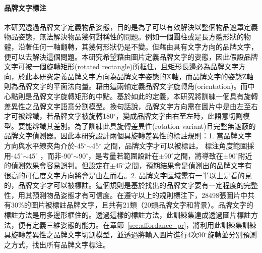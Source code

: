 \paragraph{品牌文字標注}
本研究透過品牌文字定義物品姿態，目的是為了可以有效解決以整個物品遮罩定義物品姿態，無法解決物品幾何對稱性的問題。例如一個圓柱或是長方體形狀的物體，沿著任何一軸翻轉，其幾何形狀仍是不變。但藉由具有文字方向的品牌文字，便可以去解決這個問題。本研究希望藉由圖片定義品牌文字的姿態，因此假設品牌文字可被一個旋轉矩形(rotated rectangle)所框住，且矩形長邊必為品牌文字方向，於此本研究定義品牌文字方向為品牌文字姿態的X軸，而品牌文字的姿態Z軸則為品牌文字的平面法向量。藉由這兩軸定義品牌文字旋轉角(orientation)。而中心點則是品牌文字旋轉矩形的中點。基於如此的定義，本研究將訓練一個具有旋轉差異性之品牌文字語意分割模型。換句話說，品牌文字方向需在圖片中是由左至右才可被辨識，若品牌文字被旋轉180$^{\circ}$，變成品牌文字由右至左時，此語意切割模型。要能辨識其差別。為了訓練此具旋轉差異性(rotation-variant)且完整無遮蔽的品牌文字偵測器。因此本研究設計兩個具旋轉差異性的標註規則：1. 當品牌文字方向與水平線夾角介於-45$^{\circ}$$\sim$45$^{\circ}$ 之間，品牌文字才可以被標註。
標注角度範圍採用-45$^{\circ}$$\sim$45$^{\circ}$ ，而非-90$^{\circ}$$\sim$90$^{\circ}$，是考量若範圍設計在$\pm$90$^{\circ}$之間，將導致在$\pm$90$^{\circ}$附近的偵測效果會容易誤判。但設定在$\pm$45$^{\circ}$之間，預期結果會是偵測出的品牌文字有很高的可信度文字方向將會是由左而右。2. 品牌文字區域需有一半以上是看的見的，品牌文字才可以被標註。這個規則是基於找出的品牌文字要有一定程度的完整性，用其預測物品姿態才有可信度。在遵守以上的規則標注下，28498張圖片中共有30\%的圖片被標註品牌文字，且共有21類（20類品牌文字和背景）。品牌文字的標註方法是用多邊形框住的。透過這樣的標註方法，此訓練集達成透過圖片標註方法，便有定義三維姿態的能力。在章節~\ref{sec:affordance_pr}，將利用此訓練集訓練具旋轉差異性之品牌文字切割模型，並透過將輸入圖片進行4次90$^{\circ}$旋轉並分別預測之方式，找出所有品牌文字標注。


